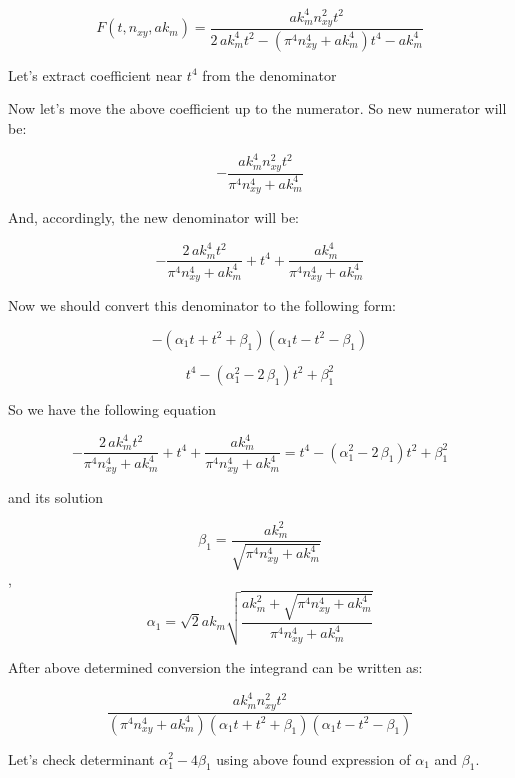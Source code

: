 \documentclass[twoside, 10pt]{article}
\begin{document}
\begin{multicols}{2}
\[F\left(t, n_{xy}, ak_m\right) = \frac{\mathit{ak}_{m}^{4} n_{\mathit{xy}}^{2} t^{2}}{2 \, \mathit{ak}_{m}^{4} t^{2} - {\left(\pi^{4} n_{\mathit{xy}}^{4} + \mathit{ak}_{m}^{4}\right)} t^{4} - \mathit{ak}_{m}^{4}}\]

    Let's extract coefficient near \(t^4\) from the denominator

    Now let's move the above coefficient up to the numerator. So new
numerator will be:

    \[-\frac{\mathit{ak}_{m}^{4} n_{\mathit{xy}}^{2} t^{2}}{\pi^{4} n_{\mathit{xy}}^{4} + \mathit{ak}_{m}^{4}}\]

    And, accordingly, the new denominator will be:

    \[-\frac{2 \, \mathit{ak}_{m}^{4} t^{2}}{\pi^{4} n_{\mathit{xy}}^{4} + \mathit{ak}_{m}^{4}} + t^{4} + \frac{\mathit{ak}_{m}^{4}}{\pi^{4} n_{\mathit{xy}}^{4} + \mathit{ak}_{m}^{4}}\]

    Now we should convert this denominator to the following form:

    \[-{\left(\alpha_{1} t + t^{2} + \beta_{1}\right)} {\left(\alpha_{1} t - t^{2} - \beta_{1}\right)}\]

\[t^{4} - {\left(\alpha_{1}^{2} - 2 \, \beta_{1}\right)} t^{2} + \beta_{1}^{2}\]


    So we have the following equation

\[-\frac{2 \, \mathit{ak}_{m}^{4} t^{2}}{\pi^{4} n_{\mathit{xy}}^{4} + \mathit{ak}_{m}^{4}} + t^{4} + \frac{\mathit{ak}_{m}^{4}}{\pi^{4} n_{\mathit{xy}}^{4} + \mathit{ak}_{m}^{4}} = t^{4} - {\left(\alpha_{1}^{2} - 2 \, \beta_{1}\right)} t^{2} + \beta_{1}^{2}\]

and its solution

\[\beta_{1} = \frac{\mathit{ak}_{m}^{2}}{\sqrt{\pi^{4} n_{\mathit{xy}}^{4} + \mathit{ak}_{m}^{4}}}\], \[\alpha_{1} = \sqrt{2} \mathit{ak}_{m} \sqrt{\frac{\mathit{ak}_{m}^{2} + \sqrt{\pi^{4} n_{\mathit{xy}}^{4} + \mathit{ak}_{m}^{4}}}{\pi^{4} n_{\mathit{xy}}^{4} + \mathit{ak}_{m}^{4}}}\]

    After above determined conversion the integrand can be written as:

    \[\frac{\mathit{ak}_{m}^{4} n_{\mathit{xy}}^{2} t^{2}}{{\left(\pi^{4} n_{\mathit{xy}}^{4} + \mathit{ak}_{m}^{4}\right)} {\left(\alpha_{1} t + t^{2} + \beta_{1}\right)} {\left(\alpha_{1} t - t^{2} - \beta_{1}\right)}}\]

    Let's check determinant \(\alpha_1^2 - 4\beta_1\) using above found
expression of \(\alpha_1\) and \(\beta_1\).


\end{multicols}
\end{document}
